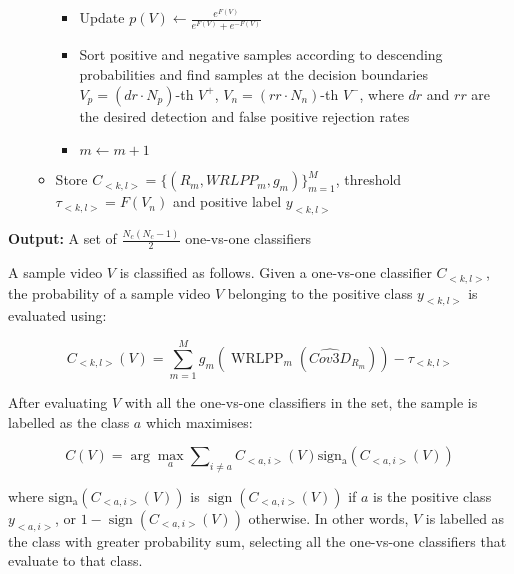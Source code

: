 \documentclass[10pt,twocolumn,letterpaper]{article}
\newcommand{\eqsize}{\footnotesize}
\newcommand{\cov}{{Cov3D}}
\newcommand{\wrlpp}{WRLPP}
\begin{document}
\begin{algorithm}
\begin{itemize}
\begin{itemize}
\begin{itemize}
            \item Update $p(V) \leftarrow \frac{e^{F(V)}}{e^{F(V)}+e^{-F(V)}}$
            \item Sort positive and negative samples according to descending probabilities and find samples at the decision boundaries
                  $V_p=(dr \cdot N_p)$-th $V^+$, $V_n=(rr \cdot N_n)$-th $V^-$, where $dr$ and $rr$ are the desired detection and false positive
                  rejection rates
            \item $m \leftarrow m + 1$
          \end{itemize}
        \item Store $C_{<k,l>}=\{(R_m,\wrlpp_m,g_m)\}_{m=1}^{M}$, threshold $\tau_{<k,l>}=F(V_n)$ and positive label $y_{<k,l>}$
      \end{itemize}
  \end{itemize}
  
  \textbf{Output:} A set of $\frac{N_c(N_c-1)}{2}$ one-vs-one classifiers
\end{algorithm}

A sample video {\eqsize $V$} is classified as follows.
Given a one-vs-one classifier {\eqsize $C_{<k,l>}$},
the probability of a sample video {\eqsize $V$} belonging to the positive class {\eqsize $y_{<k,l>}$} is evaluated using:

\vspace{-2ex}
\eqsize
\begin{equation}
\label{eq:logitboost}
  C_{<k,l>}(V) = \sum\limits_{m=1}^M g_m \left( \operatorname{WRLPP}_m(\widehat{\cov}_{R_m}) \right) - \tau_{<k,l>}
\end{equation}
\normalsize

After evaluating {\eqsize $V$} with all the one-vs-one classifiers in the set,
the sample is labelled as the class {\small $a$} which maximises:

\vspace{-2ex}
\eqsize
\begin{equation}
  C(V) = \arg \max_a \sum\nolimits_{i \neq a} C_{<a,i>}(V) \operatorname{sign_a}(C_{<a,i>}(V))
\end{equation}
\normalsize

\noindent
where {\eqsize $\operatorname{sign_a}(C_{<a,i>}(V))$} is {\eqsize $\operatorname{sign}(C_{<a,i>}(V))$}
if {\small $a$} is the positive class {\small $y_{<a,i>}$},
or {\small $1 - \operatorname{sign}(C_{<a,i>}(V))$} otherwise.
In other words, {\eqsize $V$} is labelled as the class with greater probability sum,
selecting all the one-vs-one classifiers that evaluate to that class.
\end{document}
